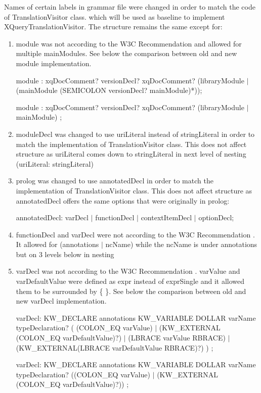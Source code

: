 Names of certain labels in grammar file were changed in order to match the code of TranslationVisitor class. which will be used as baseline to implement XQueryTranslationVisitor. The structure remains the same except for:
\begin{enumerate}
	
	\item module was not according to the W3C Recommendation \cite{XQueryRecommendation} and allowed for multiple mainModules. See below the comparison between old and new module implementation.
	
	module : xqDocComment? versionDecl? xqDocComment? (libraryModule $|$ (mainModule (SEMICOLON versionDecl? mainModule)*));
	
	module : xqDocComment? versionDecl? xqDocComment? (libraryModule $|$ mainModule) ;
	\item moduleDecl was changed to use uriLiteral instead of stringLiteral in order to match the implementation of TranslationVisitor class. This does not affect structure as uriLiteral comes down to stringLiteral in next level of nesting (uriLiteral: stringLiteral)
	\item prolog was changed to use annotatedDecl in order to match the implementation of TranslationVisitor class. This does not affect structure as annotatedDecl offers the same options that were originally in prolog:
	
	annotatedDecl: varDecl $|$ functionDecl	$|$ contextItemDecl $|$ optionDecl;
	
	\item functionDecl and varDecl were not according to the W3C Recommendation \cite{XQueryRecommendation}. It allowed for (annotations $|$ ncName) while the ncName is under annotations but on 3 levels below in nesting
 	
	\item varDecl was not according to the W3C Recommendation \cite{XQueryRecommendation}. varValue and varDefaultValue were defined as expr instead of exprSingle and it allowed them to be surrounded by \{ \}. See below the comparison between old and new varDecl implementation.
	
	varDecl: KW\_DECLARE annotations KW\_VARIABLE DOLLAR varName typeDeclaration?
	(
	(COLON\_EQ varValue)
	$|$ (KW\_EXTERNAL (COLON\_EQ varDefaultValue)?)
	$|$ (LBRACE varValue RBRACE)
	$|$ (KW\_EXTERNAL(LBRACE varDefaultValue RBRACE)?)
	) ; 
	
	varDecl: KW\_DECLARE annotations KW\_VARIABLE DOLLAR varName typeDeclaration?
	((COLON\_EQ varValue)
	$|$ (KW\_EXTERNAL (COLON\_EQ varDefaultValue)?)) ;
	

\end{enumerate}
